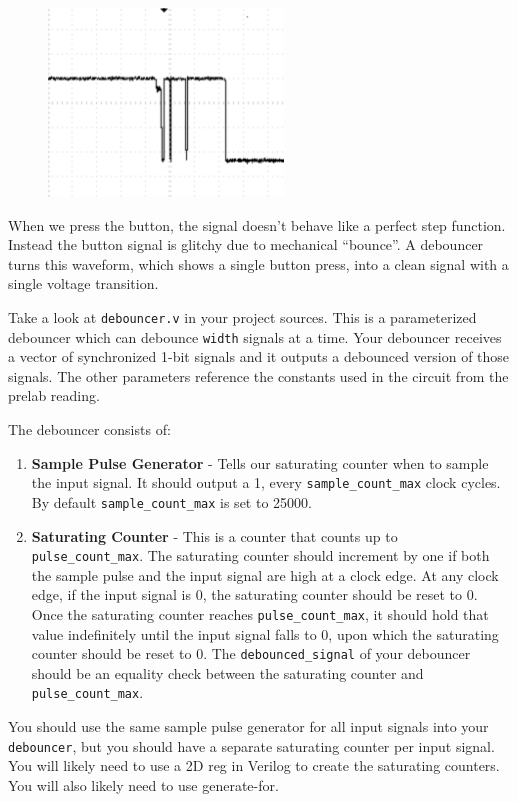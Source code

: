 \documentclass[11pt]{article}
\begin{document}
\begin{figure}[H]
	\centerline{\includegraphics[height=5cm]{figs/lab2_fig4.png}}
\end{figure}

When we press the button, the signal doesn't behave like a perfect step function. Instead the button signal is glitchy due to mechanical ``bounce''. A debouncer turns this waveform, which shows a single button press, into a clean signal with a single voltage transition.

Take a look at \verb|debouncer.v| in your project sources. This is a parameterized debouncer which can debounce \verb|width| signals at a time. Your debouncer receives a vector of synchronized 1-bit signals and it outputs a debounced version of those signals. The other parameters reference the constants used in the circuit from the prelab reading.

The debouncer consists of:

\begin{enumerate}
	\item \textbf{Sample Pulse Generator} - Tells our saturating counter when to sample the input signal. It should output a 1, every \verb|sample_count_max| clock cycles. By default \verb|sample_count_max| is set to 25000.
	\item \textbf{Saturating Counter} - This is a counter that counts up to \verb|pulse_count_max|. The saturating counter should increment by one if both the sample pulse and the input signal are high at a clock edge. At any clock edge, if the input signal is 0, the saturating counter should be reset to 0. Once the saturating counter reaches \verb|pulse_count_max|, it should hold that value indefinitely until the input signal falls to 0, upon which the saturating counter should be reset to 0. The \verb|debounced_signal| of your debouncer should be an equality check between the saturating counter and \verb|pulse_count_max|.
\end{enumerate}

You should use the same sample pulse generator for all input signals into your \verb|debouncer|, but you should have a separate saturating counter per input signal. You will likely need to use a 2D reg in Verilog to create the saturating counters. You will also likely need to use generate-for.
\end{document}
